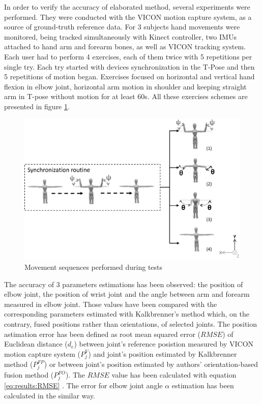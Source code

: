 \documentclass[sensors,article,submit,moreauthors,pdftex,10pt,a4paper]{mdpi}
\begin{document}
In order to verify the accuracy of elaborated method, several experiments were performed. They were conducted with the VICON motion capture system, as a source of ground-truth reference data. For 3 subjects hand movements were monitored, being tracked simultaneously with Kinect controller, two IMUs attached to hand arm and forearm bones, as well as VICON tracking system. Each user had to perform 4 exercises, each of them twice with 5 repetitions per single try. Each try started with devices synchronization in the T-Pose and then 5 repetitions of motion began. Exercises focused on horizontal and vertical hand flexion in elbow joint, horizontal arm motion in shoulder and keeping straight arm in T-pose without motion for at least 60s. All these exercises schemes are presented in figure \ref{fig:results:sequences}.

\begin{figure}[H]
	\centering
	\includegraphics[width=12cm]{Figure8.png}
	\caption{Movement sequences performed during tests}
	\label{fig:results:sequences}
\end{figure}

The accuracy of 3 parameters estimations has been observed: the position of elbow joint, the position of wrist joint and the angle between arm and forearm measured in elbow joint. Those values have been compared with the corresponding parameters estimated with Kalkbrenner’s method \cite{Kalkbrenner2014} which, on the contrary, fused positions rather than orientations, of selected joints. The position astimation error has been defined as root mean squared error ($RMSE$) of Euclidean distance ($d_e$) between joint’s reference posistion measured by VICON motion capture system ($P_j^V$) and joint’s position estimated by Kalkbrenner method ($P_j^{FP}$) or between joint’s position estimated by authors’ orientation-based fusion method ($P_j^{FO}$). The $RMSE$ value has been calculated with equation \ref{eq:results:RMSE} \cite{Armstrong1992}. The error for elbow joint angle $\alpha$ estimation has been calculated in the similar way.
\end{document}
